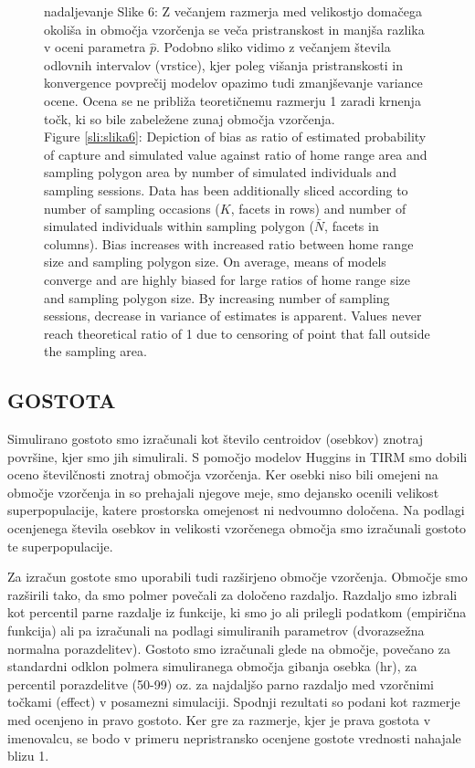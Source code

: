 \begin{figure}\ContinuedFloat
\caption*{nadaljevanje Slike 6: Z večanjem razmerja med velikostjo domačega okoliša in območja vzorčenja se veča pristranskost in manjša razlika v oceni parametra $\hat{p}$. Podobno sliko vidimo z večanjem števila odlovnih intervalov (vrstice), kjer poleg višanja pristranskosti in konvergence povprečij modelov opazimo tudi zmanjševanje variance ocene. Ocena se ne približa teoretičnemu razmerju 1 zaradi krnenja točk, ki so bile zabeležene zunaj območja vzorčenja.\\

Figure \ref{sli:slika6}: Depiction of bias as ratio of estimated probability of capture and simulated value against ratio of home range area and sampling polygon area by number of simulated individuals and sampling sessions. Data has been additionally sliced according to number of sampling occasions ($K$, facets in rows) and number of simulated individuals within sampling polygon ($\bar{N}$, facets in columns). Bias increases with increased ratio between home range size and sampling polygon size. On average, means of models converge and are highly biased for large ratios of home range size and sampling polygon size. By increasing number of sampling sessions, decrease in variance of estimates is apparent. Values never reach theoretical ratio of 1 due to censoring of point that fall outside the sampling area.}
\end{figure}

\subsection{GOSTOTA}
Simulirano gostoto smo izračunali kot število centroidov (osebkov) znotraj površine, kjer smo jih simulirali. S pomočjo modelov Huggins in TIRM smo dobili oceno številčnosti znotraj območja vzorčenja. Ker osebki niso bili omejeni na območje vzorčenja in so prehajali njegove meje, smo dejansko ocenili velikost superpopulacije, katere prostorska omejenost ni nedvoumno določena. Na podlagi ocenjenega števila osebkov in velikosti vzorčenega območja smo izračunali gostoto te superpopulacije.

Za izračun gostote smo uporabili tudi razširjeno območje vzorčenja. Območje smo razširili tako, da smo polmer povečali za določeno razdaljo. Razdaljo smo izbrali kot percentil parne razdalje iz funkcije, ki smo jo ali prilegli podatkom (empirična funkcija) ali pa izračunali na podlagi simuliranih parametrov (dvorazsežna normalna porazdelitev). Gostoto smo izračunali glede na območje, povečano za standardni odklon polmera simuliranega območja gibanja osebka (hr), za percentil porazdelitve (50-99) oz. za najdaljšo parno razdaljo med vzorčnimi točkami (effect) v posamezni simulaciji. Spodnji rezultati so podani kot razmerje med ocenjeno in pravo gostoto. Ker gre za razmerje, kjer je prava gostota v imenovalcu, se bodo v primeru nepristransko ocenjene gostote vrednosti nahajale blizu 1.


